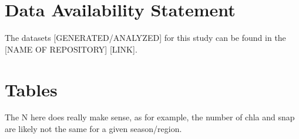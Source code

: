 \documentclass[utf8]{frontiersSCNS} %
\begin{document}
\section*{Data Availability Statement}
The datasets [GENERATED/ANALYZED] for this study can be found in the [NAME OF REPOSITORY] [LINK].




\section*{Tables}

The N here does really make sense, as for example, the number of chla and snap are likely not the same for a given season/region.
\end{document}
